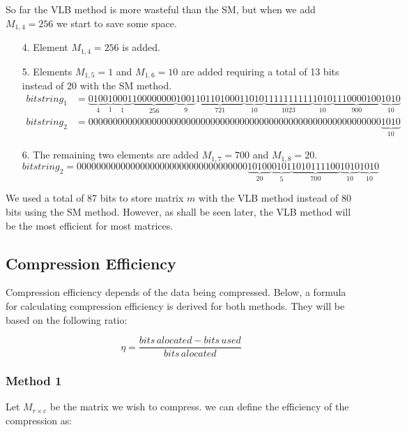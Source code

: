 \documentclass[10pt]{article}
\begin{document}
So far the VLB method is more wasteful than the SM, but when we add $M_{1,4} =256$  we start to save some space.

\begin{enumerate}
 \item[4.] Element $M_{1,4} =256$ is added.  
 \item [5.] Elements $M_{1,5} =1$ and $M_{1,6} =10$ are added requiring a total of 13 bits instead of 20 with the SM method.
 \begin{align*} \label{eq:16}
 bitstring_1 &=
 \underbrace{0100}_{4}\underbrace{1}_{1}\underbrace{0001}_{1}\underbrace{100000000}_{256}\underbrace{1001}_{9}\underbrace{1011010001}_{721}\underbrace{1010}_{10}\underbrace{1111111111}_{1023}\underbrace{1010}_{10}\underbrace{1110000100}_{900}\underbrace{1010}_{10} \\
 bitstring_2 &= 000000000000000000000000000000000000000000000000000000000000\underbrace{1010}_{10}
\end{align*}
 \item [6.] The remaining two elements are added $M_{1,7} =700$ and $M_{1,8} =20$.
 \begin{equation*} \label{eq:18}
 bitstring_2 = 00000000000000000000000000000000000\underbrace{10100}_{20}\underbrace{0101}_{5}\underbrace{1010111100}_{700}\underbrace{1010}_{10}\underbrace{1010}_{10}
\end{equation*}
\end{enumerate}





 We used a total of 87 bits to store matrix $m$ with the VLB method instead of 80 bits using the SM method. However, as shall be seen later, the VLB method will be the most efficient for most matrices.
 
 \subsection*{Compression Efficiency}
 Compression efficiency depends of the data being compressed. Below, a formula for calculating compression efficiency is derived for both methods. They will be based on the following ratio:
 
 \begin{equation}\label{eq:eff1}
  \eta=\frac{bits\, alocated-bits\, used}{bits\,alocated}
 \end{equation}
 \subsubsection*{Method 1}
 Let $M_{r \times c}$ be the matrix we wish to compress. we can define the efficiency of the compression as:
 
\end{document}
